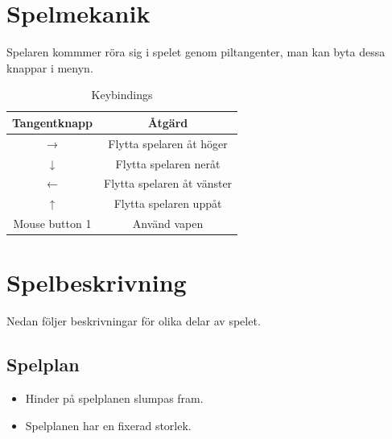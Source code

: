 \documentclass{TDP005mall}
\begin{document}
  \section{Spelmekanik}
  Spelaren kommmer röra sig i spelet genom piltangenter, man kan byta dessa knappar i menyn.
  \begin{table}[!h]
      \caption{Keybindings}
    \label{tab:movement}
    \begin{center}
      \begin{tabular}{ |c|c| }
        \hline
        \textbf{Tangentknapp} & \textbf{Åtgärd} \\
        \hline
        → & Flytta spelaren åt höger \\
        \hline
        ↓ & Flytta spelaren neråt \\
        \hline
        ← & Flytta spelaren åt vänster \\
        \hline
        ↑ & Flytta spelaren uppåt \\
        \hline
        Mouse button 1 & Använd vapen \\
        \hline
      \end{tabular}
    \end{center}

  \end{table}

  \section{Spelbeskrivning}
  Nedan följer beskrivningar för olika delar av spelet.
  
  \subsection{Spelplan}
  \begin{itemize}
    \item Hinder på spelplanen slumpas fram.
    \item Spelplanen har en fixerad storlek.
  \end{itemize}
\end{document}
